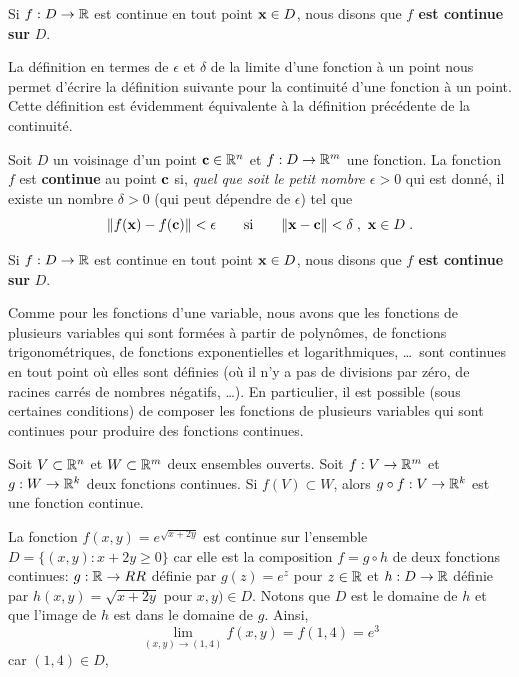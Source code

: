 {\begin{defn}
Si $f:D\rightarrow \mathbb{R}$ est continue en tout point $\mathbf{x} \in D$,
nous disons que {\bfseries $f$ est continue sur} $D$.
\end{defn}

La définition en termes de $\epsilon$ et $\delta$ de la limite d'une
fonction à un point nous permet d'écrire la définition suivante pour
la continuité d'une fonction à un point.  Cette définition est
évidemment équivalente à la définition précédente de la continuité.

\begin{defn}[+\theory] 
Soit $D$ un voisinage d'un point $\mathbf{c} \in \mathbb{R}^n$ et
$f:D\rightarrow \mathbb{R}^m$ une fonction.  La fonction $f$ est
{\bfseries continue} au point $\mathbf{c}$ si,
{\em quel que soit le petit nombre $\epsilon >0$} qui est donné, il
existe un nombre $\delta >0$ (qui peut dépendre de $\epsilon$)
tel que
\[
\|f(\mathbf{x}) - f(\mathbf{c})\| < \epsilon \qquad \text{si} \qquad
\|\mathbf{x}-\mathbf{c}\|<\delta \; ,\ \mathbf{x} \in D \; .
\]

Si $f:D\rightarrow \mathbb{R}$ est continue en tout point $\mathbf{x} \in D$,
nous disons que {\bfseries $f$ est continue sur} $D$.
\end{defn}

Comme pour les fonctions d'une variable, nous avons que les fonctions de
plusieurs variables qui sont formées à partir de polynômes, de
fonctions trigonométriques, de fonctions exponentielles et
logarithmiques, \ldots\ sont continues en tout point où elles sont
définies (où il n'y a pas de divisions par zéro, de racines carrés de
nombres négatifs, \ldots).  En particulier, il est possible (sous
certaines conditions) de composer les fonctions de plusieurs variables
qui sont continues pour produire des fonctions continues.

\begin{theorem}
Soit $V \subset \mathbb{R}^n$ et $W \subset \mathbb{R}^m$ deux ensembles ouverts.
Soit $f:V\rightarrow \mathbb{R}^m$ et $g:W\rightarrow \mathbb{R}^k$ deux fonctions
continues.  Si $f(V) \subset W$, alors $g\circ f:V\rightarrow \mathbb{R}^k$
est une fonction continue.
\end{theorem}

\begin{egg}
La fonction $f(x,y) = e^{\sqrt{x+2y}}$ est continue sur l'ensemble
$D = \{ (x,y) : x+2y \geq 0 \}$ car elle est la composition
$f = g\circ h$ de deux fonctions continues: $g:\mathbb{R} \to \\RR$ définie par
$g(z) = e^z$ pour $z\in \mathbb{R}$ et $h:D \to \mathbb{R}$ définie par
$h(x,y) = \sqrt{x+2y}$ pour $x,y) \in D$.  Notons que
$D$ est le domaine de $h$ et que l'image de $h$ est dans le domaine de
$g$.  Ainsi,
\[
\lim_{(x,y)\rightarrow (1,4)} f(x,y) = f(1,4) = e^3
\]
car $(1,4)\in D$,
\end{egg}

}
